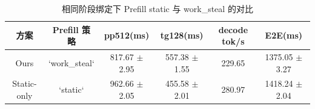 \begin{table}[ht]
  \centering
  \caption{相同阶段绑定下 Prefill static 与 work\_steal 的对比}
  \label{tab:static-vs-worksteal}
  \begin{tabular}{c c c c c c}
    \hline
    方案 & Prefill 策略 & pp512(ms) & tg128(ms) & decode tok/s & E2E(ms) \\
    \hline
    Ours & `work_steal` & 817.67 $\pm$ 2.95 & 557.38 $\pm$ 1.55 & 229.65 & 1375.05 $\pm$ 3.27 \\
    Static-only & `static` & 962.66 $\pm$ 2.05 & 455.58 $\pm$ 2.01 & 280.97 & 1418.24 $\pm$ 2.04 \\
    \hline
  \end{tabular}
\end{table}
